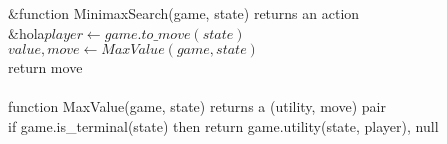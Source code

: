 \documentclass[preview]{standalone}
\begin{document}
\begin{center}
&function MinimaxSearch(game, state) returns an action\\&hola$player \gets game.to\_move(state)$\\$value, move \gets MaxValue(game, state)$\\return move\\\\function MaxValue(game, state) returns a (utility, move) pair\\if game.is\_terminal(state) then return game.utility(state, player), null
\end{center}
\end{document}
